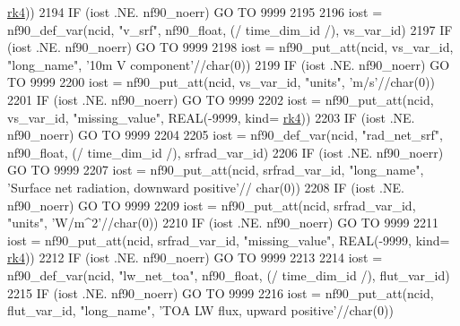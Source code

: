 \begin{DoxyCode}
{{      \hyperlink{namespaceportable_abaed22a509442771d3fba69bebda0b33}{rk4}))
2194     \textcolor{keywordflow}{IF} (iost .NE. nf90\_noerr) \textcolor{keywordflow}{GO TO} 9999
2195 
2196     iost    = nf90\_def\_var(ncid, \textcolor{stringliteral}{"v\_srf"}, nf90\_float, (/ time\_dim\_id /), vs\_var\_id)
2197     \textcolor{keywordflow}{IF} (iost .NE. nf90\_noerr) \textcolor{keywordflow}{GO TO} 9999
2198     iost    = nf90\_put\_att(ncid, vs\_var\_id, \textcolor{stringliteral}{"long\_name"}, \textcolor{stringliteral}{'10m V component'}//char(0))
2199     \textcolor{keywordflow}{IF} (iost .NE. nf90\_noerr) \textcolor{keywordflow}{GO TO} 9999
2200     iost    = nf90\_put\_att(ncid, vs\_var\_id, \textcolor{stringliteral}{"units"}, \textcolor{stringliteral}{'m/s'}//char(0))
2201     \textcolor{keywordflow}{IF} (iost .NE. nf90\_noerr) \textcolor{keywordflow}{GO TO} 9999
2202     iost    = nf90\_put\_att(ncid, vs\_var\_id, \textcolor{stringliteral}{"missing\_value"}, \textcolor{keywordtype}{REAL}(-9999, kind=
      \hyperlink{namespaceportable_abaed22a509442771d3fba69bebda0b33}{rk4}))
2203     \textcolor{keywordflow}{IF} (iost .NE. nf90\_noerr) \textcolor{keywordflow}{GO TO} 9999
2204 
2205     iost    = nf90\_def\_var(ncid, \textcolor{stringliteral}{"rad\_net\_srf"}, nf90\_float, (/ time\_dim\_id /), srfrad\_var\_id)
2206     \textcolor{keywordflow}{IF} (iost .NE. nf90\_noerr) \textcolor{keywordflow}{GO TO} 9999
2207     iost    = nf90\_put\_att(ncid, srfrad\_var\_id, \textcolor{stringliteral}{"long\_name"}, \textcolor{stringliteral}{'Surface net radiation, downward positive'}//
      char(0))
2208     \textcolor{keywordflow}{IF} (iost .NE. nf90\_noerr) \textcolor{keywordflow}{GO TO} 9999
2209     iost    = nf90\_put\_att(ncid, srfrad\_var\_id, \textcolor{stringliteral}{"units"}, \textcolor{stringliteral}{'W/m^2'}//char(0))
2210     \textcolor{keywordflow}{IF} (iost .NE. nf90\_noerr) \textcolor{keywordflow}{GO TO} 9999
2211     iost    = nf90\_put\_att(ncid, srfrad\_var\_id, \textcolor{stringliteral}{"missing\_value"}, \textcolor{keywordtype}{REAL}(-9999, kind=
      \hyperlink{namespaceportable_abaed22a509442771d3fba69bebda0b33}{rk4}))
2212     \textcolor{keywordflow}{IF} (iost .NE. nf90\_noerr) \textcolor{keywordflow}{GO TO} 9999
2213 
2214     iost    = nf90\_def\_var(ncid, \textcolor{stringliteral}{"lw\_net\_toa"}, nf90\_float, (/ time\_dim\_id /), flut\_var\_id)
2215     \textcolor{keywordflow}{IF} (iost .NE. nf90\_noerr) \textcolor{keywordflow}{GO TO} 9999
2216     iost    = nf90\_put\_att(ncid, flut\_var\_id, \textcolor{stringliteral}{"long\_name"}, \textcolor{stringliteral}{'TOA LW flux, upward positive'}//char(0))
}}
\end{DoxyCode}
